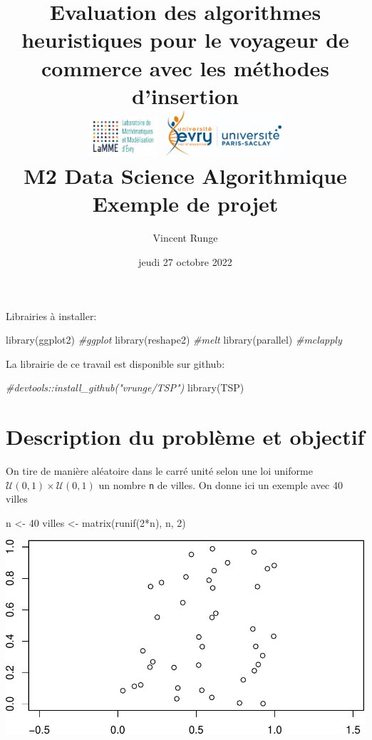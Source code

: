 \documentclass[
]{article}
\title{Evaluation des algorithmes heuristiques pour le voyageur de
commerce avec les méthodes d'insertion\\
\includegraphics[width=1in,height=\textheight]{Images/logo_lamme.png}
\includegraphics[width=1.7in,height=\textheight]{Images/logo_UEVE.png}\\
\hspace*{0.333em}M2 Data Science Algorithmique\\
Exemple de projet}
\author{Vincent Runge}
\date{jeudi 27 octobre 2022}
\newenvironment{Shaded}{\begin{snugshade}}{\end{snugshade}}
\newcommand{\CommentTok}[1]{\textcolor[rgb]{0.56,0.35,0.01}{\textit{#1}}}
\newcommand{\DecValTok}[1]{\textcolor[rgb]{0.00,0.00,0.81}{#1}}
\newcommand{\FunctionTok}[1]{\textcolor[rgb]{0.00,0.00,0.00}{#1}}
\newcommand{\NormalTok}[1]{#1}
\newcommand{\OtherTok}[1]{\textcolor[rgb]{0.56,0.35,0.01}{#1}}
\newcommand{\SpecialCharTok}[1]{\textcolor[rgb]{0.00,0.00,0.00}{#1}}
\begin{document}
\maketitle

{
\hypersetup{linkcolor=}
\setcounter{tocdepth}{2}
\tableofcontents
}
\noindent\hrulefill

Librairies à installer:

\begin{Shaded}
\begin{Highlighting}[]
\FunctionTok{library}\NormalTok{(ggplot2) }\CommentTok{\#ggplot}
\FunctionTok{library}\NormalTok{(reshape2) }\CommentTok{\#melt}
\FunctionTok{library}\NormalTok{(parallel) }\CommentTok{\#mclapply}
\end{Highlighting}
\end{Shaded}

La librairie de ce travail est disponible sur github:

\begin{Shaded}
\begin{Highlighting}[]
\CommentTok{\#devtools::install\_github("vrunge/TSP")}
\FunctionTok{library}\NormalTok{(TSP)}
\end{Highlighting}
\end{Shaded}

\hypertarget{description-du-probluxe8me-et-objectif}{%
\section{Description du problème et
objectif}\label{description-du-probluxe8me-et-objectif}}

On tire de manière aléatoire dans le carré unité selon une loi uniforme
\(\mathcal{U}(0,1) \times \mathcal{U}(0,1)\) un nombre \texttt{n} de
villes. On donne ici un exemple avec 40 villes

\begin{Shaded}
\begin{Highlighting}[]
\NormalTok{n }\OtherTok{\textless{}{-}} \DecValTok{40}
\NormalTok{villes }\OtherTok{\textless{}{-}} \FunctionTok{matrix}\NormalTok{(}\FunctionTok{runif}\NormalTok{(}\DecValTok{2}\SpecialCharTok{*}\NormalTok{n), n, }\DecValTok{2}\NormalTok{)}
\end{Highlighting}
\end{Shaded}

\includegraphics{rapport_TSP_files/figure-latex/plot example-1.pdf}
\end{document}
